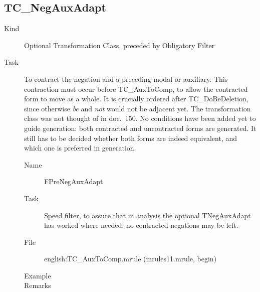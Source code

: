 \subsection{TC\_NegAuxAdapt}
\begin{description}
\item[Kind] Optional Transformation Class, preceded by Obligatory Filter
\item[Task] To contract the negation and a preceding modal or auxiliary.
This contraction must occur before TC\_AuxToComp, to allow the contracted form 
to move as a whole. It is crucially ordered after TC\_DoBeDeletion, since 
otherwise {\em 
be\/} and {\em not\/} would not be adjacent yet. The transformation class was 
not thought of in doc.\ 150. No conditions have been added yet to 
guide generation: both contracted and uncontracted forms are generated. It 
still has to be decided whether both forms are indeed equivalent, and which one 
is preferred in generation.

\vspace{1 cm}
\begin{description}
\item[Name] FPreNegAuxAdapt
\item[Task] Speed filter, to assure that in analysis the optional TNegAuxAdapt 
has worked where needed: no contracted negations may be left.
\item[File] english:TC\_AuxToComp.mrule (mrules11.mrule, begin)
\item[Example] 
\item[Remarks]
\end{description}


\end{description}
